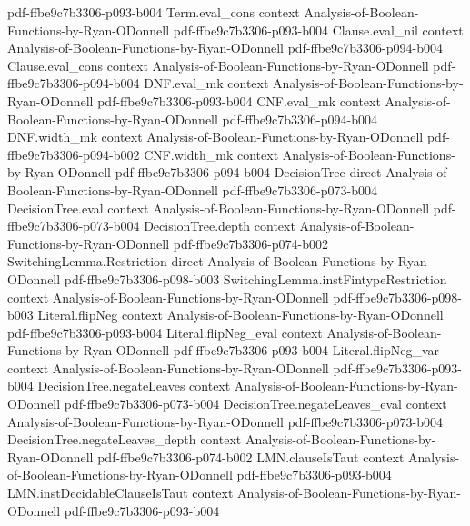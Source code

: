 \begin{lemma}
  {pdf-ffbe9c7b3306-p093-b004}
\proofstep
  {Term.eval_cons}
  {context}
  {Analysis-of-Boolean-Functions-by-Ryan-ODonnell}
  {pdf-ffbe9c7b3306-p093-b004}
\proofstep
  {Clause.eval_nil}
  {context}
  {Analysis-of-Boolean-Functions-by-Ryan-ODonnell}
  {pdf-ffbe9c7b3306-p094-b004}
\proofstep
  {Clause.eval_cons}
  {context}
  {Analysis-of-Boolean-Functions-by-Ryan-ODonnell}
  {pdf-ffbe9c7b3306-p094-b004}
\proofstep
  {DNF.eval_mk}
  {context}
  {Analysis-of-Boolean-Functions-by-Ryan-ODonnell}
  {pdf-ffbe9c7b3306-p093-b004}
\proofstep
  {CNF.eval_mk}
  {context}
  {Analysis-of-Boolean-Functions-by-Ryan-ODonnell}
  {pdf-ffbe9c7b3306-p094-b004}
\proofstep
  {DNF.width_mk}
  {context}
  {Analysis-of-Boolean-Functions-by-Ryan-ODonnell}
  {pdf-ffbe9c7b3306-p094-b002}
\proofstep
  {CNF.width_mk}
  {context}
  {Analysis-of-Boolean-Functions-by-Ryan-ODonnell}
  {pdf-ffbe9c7b3306-p094-b004}
\proofstep
  {DecisionTree}
  {direct}
  {Analysis-of-Boolean-Functions-by-Ryan-ODonnell}
  {pdf-ffbe9c7b3306-p073-b004}
\proofstep
  {DecisionTree.eval}
  {context}
  {Analysis-of-Boolean-Functions-by-Ryan-ODonnell}
  {pdf-ffbe9c7b3306-p073-b004}
\proofstep
  {DecisionTree.depth}
  {context}
  {Analysis-of-Boolean-Functions-by-Ryan-ODonnell}
  {pdf-ffbe9c7b3306-p074-b002}
\proofstep
  {SwitchingLemma.Restriction}
  {direct}
  {Analysis-of-Boolean-Functions-by-Ryan-ODonnell}
  {pdf-ffbe9c7b3306-p098-b003}
\proofstep
  {SwitchingLemma.instFintypeRestriction}
  {context}
  {Analysis-of-Boolean-Functions-by-Ryan-ODonnell}
  {pdf-ffbe9c7b3306-p098-b003}
\proofstep
  {Literal.flipNeg}
  {context}
  {Analysis-of-Boolean-Functions-by-Ryan-ODonnell}
  {pdf-ffbe9c7b3306-p093-b004}
\proofstep
  {Literal.flipNeg_eval}
  {context}
  {Analysis-of-Boolean-Functions-by-Ryan-ODonnell}
  {pdf-ffbe9c7b3306-p093-b004}
\proofstep
  {Literal.flipNeg_var}
  {context}
  {Analysis-of-Boolean-Functions-by-Ryan-ODonnell}
  {pdf-ffbe9c7b3306-p093-b004}
\proofstep
  {DecisionTree.negateLeaves}
  {context}
  {Analysis-of-Boolean-Functions-by-Ryan-ODonnell}
  {pdf-ffbe9c7b3306-p073-b004}
\proofstep
  {DecisionTree.negateLeaves_eval}
  {context}
  {Analysis-of-Boolean-Functions-by-Ryan-ODonnell}
  {pdf-ffbe9c7b3306-p073-b004}
\proofstep
  {DecisionTree.negateLeaves_depth}
  {context}
  {Analysis-of-Boolean-Functions-by-Ryan-ODonnell}
  {pdf-ffbe9c7b3306-p074-b002}
\proofstep
  {LMN.clauseIsTaut}
  {context}
  {Analysis-of-Boolean-Functions-by-Ryan-ODonnell}
  {pdf-ffbe9c7b3306-p093-b004}
\proofstep
  {LMN.instDecidableClauseIsTaut}
  {context}
  {Analysis-of-Boolean-Functions-by-Ryan-ODonnell}
  {pdf-ffbe9c7b3306-p093-b004}

\end{lemma}

